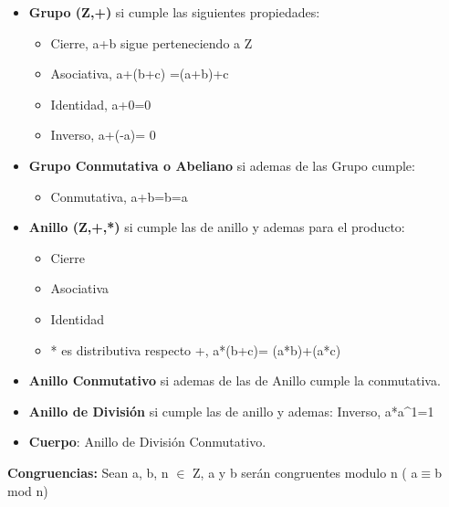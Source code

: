 \documentclass[12pt, twoside, openright]{report} %
\begin{document}
  \begin{itemize}
  \item \textbf{Grupo (Z,+)} si cumple las siguientes propiedades:
    

    \begin{itemize}
    \item Cierre, a+b sigue perteneciendo a Z
      
    \item Asociativa, a+(b+c) =(a+b)+c
      
    \item Identidad, a+0=0
      
    \item Inverso, a+(-a)= 0
      
    \end{itemize}
  \item \textbf{Grupo Conmutativa o Abeliano} si ademas de las Grupo cumple:
    

    \begin{itemize}
    \item Conmutativa, a+b=b=a
      
    \end{itemize}
  \item \textbf{Anillo (Z,+,*)} si cumple las de anillo y ademas para el
    producto:
    

    \begin{itemize}
    \item Cierre
      
    \item Asociativa
      
    \item Identidad
      
    \item * es distributiva respecto +, a*(b+c)= (a*b)+(a*c)
      
    \end{itemize}
  \item \textbf{Anillo Conmutativo} si ademas de las de Anillo cumple la
    conmutativa.
    
  \item \textbf{Anillo de División} si cumple las de anillo y ademas:
    Inverso, a*a\^{}1=1
    
  \item \textbf{Cuerpo}: Anillo de División Conmutativo.
    
  \end{itemize}

  
  \textbf{Congruencias:} Sean a, b, n $\in$ Z, a y b serán congruentes
  modulo n ( a$\equiv$b mod n)
  
\end{document}
